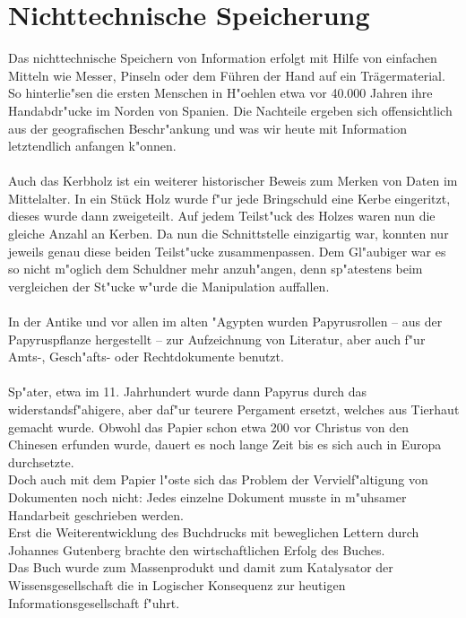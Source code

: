 
\chapter{Nichttechnische Speicherung}
\label{ch:Nichttechnische Speicherung}
Das nichttechnische Speichern von Information erfolgt mit Hilfe von einfachen Mitteln wie Messer, Pinseln oder dem Führen der Hand auf ein Trägermaterial. So hinterlie"sen die ersten Menschen in H"oehlen etwa vor 40.000 Jahren ihre Handabdr"ucke im Norden von Spanien\cite{spiegel:hoehle}. Die Nachteile ergeben sich offensichtlich aus der geografischen Beschr"ankung und was wir heute mit Information letztendlich anfangen k"onnen.
\\
\\
Auch das Kerbholz ist ein weiterer historischer Beweis zum Merken von Daten im Mittelalter. In ein Stück Holz wurde f"ur jede Bringschuld eine Kerbe eingeritzt, dieses wurde dann zweigeteilt. Auf jedem Teilst"uck des Holzes waren nun die gleiche Anzahl an Kerben. Da nun die Schnittstelle einzigartig war, konnten nur jeweils genau diese beiden Teilst"ucke zusammenpassen. Dem Gl"aubiger war es so nicht m"oglich dem Schuldner mehr anzuh"angen, denn sp"atestens beim vergleichen der St"ucke w"urde die Manipulation auffallen.\cite{carlen:kerbholz} 
\\
\\
In der Antike und vor allen im alten "Agypten wurden Papyrusrollen – aus der Papyruspflanze hergestellt – zur Aufzeichnung von Literatur, aber auch f"ur Amts-, Gesch"afts- oder Rechtdokumente benutzt. 
\\
\\
Sp"ater, etwa im 11. Jahrhundert wurde dann Papyrus durch das widerstandsf"ahigere, aber daf"ur teurere Pergament ersetzt, welches aus Tierhaut gemacht wurde.
Obwohl das Papier schon etwa 200 vor Christus von den Chinesen erfunden wurde, dauert es noch lange Zeit bis es sich auch in Europa durchsetzte. 
\\
Doch auch mit dem Papier l"oste sich das Problem der Vervielf"altigung von Dokumenten noch nicht: 
Jedes einzelne Dokument musste in m"uhsamer Handarbeit geschrieben werden. 
\\
Erst die Weiterentwicklung des Buchdrucks mit beweglichen Lettern durch Johannes Gutenberg brachte den wirtschaftlichen Erfolg des Buches.
\\
Das Buch wurde zum Massenprodukt und damit zum Katalysator der Wissensgesellschaft die in Logischer Konsequenz zur heutigen Informationsgesellschaft f"uhrt.


